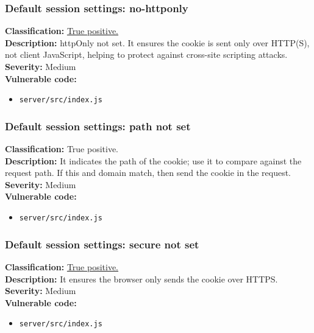 \documentclass[]{article}
\begin{document}
\subsubsection{Default session settings: no-httponly}
\textbf{Classification:} \hyperref[subsubsec:cross_site_scripting]{True positive.} \\ 
\textbf{Description:} httpOnly not set. It ensures the cookie is sent only over
          HTTP(S), not client JavaScript, helping to protect against cross-site scripting attacks. \\
\textbf{Severity:}  Medium\\ 
\textbf{Vulnerable code:}
\begin{itemize}
    \item \texttt{server/src/index.js}
\end{itemize}


\subsubsection{Default session settings: path not set}
\textbf{Classification:} {True positive.} \\
\textbf{Description:} It indicates the path of the cookie; use it to compare against the request path. If this and domain match, then send the cookie in the request.\\
\textbf{Severity:}  Medium\\ 
\textbf{Vulnerable code:}
\begin{itemize}
    \item \texttt{server/src/index.js}
\end{itemize}

\subsubsection{Default session settings: secure not set}
\textbf{Classification:} \hyperref[subsubsec:sensitive_cookie_without_secure_and_httponly_attributes]{True positive.} \\ 
\textbf{Description:} It ensures the browser only sends the cookie over HTTPS. \\
\textbf{Severity:}  Medium\\ 
\textbf{Vulnerable code:}
\begin{itemize}
    \item \texttt{server/src/index.js}
\end{itemize}
\end{document}
